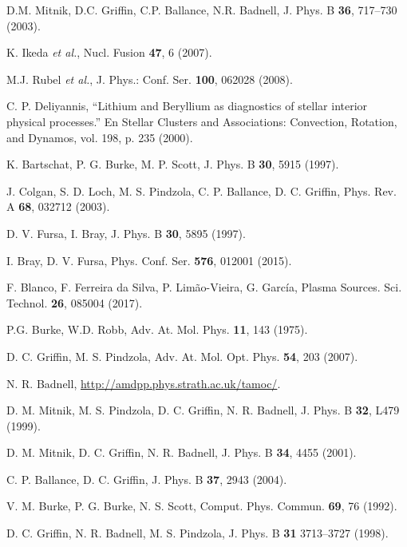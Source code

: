 \begin{thebibliography}{9}
D.M. Mitnik, D.C. Griffin, C.P. Ballance, N.R. Badnell, 
J. Phys. B \textbf{36}, 717--730 (2003).

K. Ikeda \textit{et al.},
Nucl. Fusion \textbf{47}, 6 (2007).

M.J. Rubel \textit{et al.},
J. Phys.: Conf. Ser. \textbf{100}, 062028 (2008).

C. P. Deliyannis, 
``Lithium and Beryllium as diagnostics of stellar interior physical 
processes.'' En Stellar Clusters and Associations: Convection, Rotation, 
and Dynamos, vol. 198, p. 235 (2000).

K. Bartschat, P. G. Burke, M. P. Scott, 
J. Phys. B \textbf{30}, 5915 (1997).

J. Colgan, S. D. Loch, M. S. Pindzola, C. P. Ballance, D. C. Griffin, 
Phys. Rev. A \textbf{68}, 032712 (2003).

D. V. Fursa, I. Bray, 
J. Phys. B \textbf{30}, 5895 (1997).

I. Bray, D. V. Fursa, 
Phys. Conf. Ser. \textbf{576}, 012001 (2015).

F. Blanco, F. Ferreira da Silva, P. Lim\~ao-Vieira, G. García, 
Plasma Sources. Sci. Technol. \textbf{26}, 085004 (2017).

P.G. Burke, W.D. Robb, 
Adv. At. Mol. Phys. \textbf{11}, 143 (1975).

D. C. Griffin, M. S. Pindzola,
Adv. At. Mol. Opt. Phys. \textbf{54}, 203 (2007).

N. R. Badnell,
\href{http://amdpp.phys.strath.ac.uk/tamoc/}
{http://amdpp.phys.strath.ac.uk/tamoc/}.

D. M. Mitnik, M. S. Pindzola, D. C. Griffin, N. R. Badnell, 
J. Phys. B \textbf{32}, L479 (1999).

D. M. Mitnik, D. C. Griffin, N. R. Badnell, 
J. Phys. B \textbf{34}, 4455 (2001).

C. P. Ballance, D. C. Griffin, 
J. Phys. B \textbf{37}, 2943 (2004).

V. M. Burke, P. G. Burke, N. S. Scott, 
Comput. Phys. Commun. \textbf{69}, 76 (1992).

D. C. Griffin, N. R. Badnell, M. S. Pindzola, 
J. Phys. B \textbf{31} 3713--3727 (1998).


\end{thebibliography}
